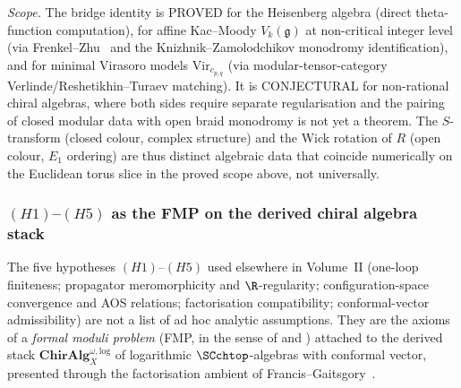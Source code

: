 \begin{remark}
\begin{enumerate}[label=(\alph*)]
\end{enumerate}
\emph{Scope.} The bridge identity is PROVED for the Heisenberg
algebra (direct theta-function computation), for affine Kac--Moody
$V_k(\mathfrak g)$ at non-critical integer level (via
Frenkel--Zhu~\cite{FrenkelZhu92} and the Knizhnik--Zamolodchikov
monodromy identification), and for minimal Virasoro models
$\mathrm{Vir}_{c_{p,q}}$ (via modular-tensor-category
Verlinde/Reshetikhin--Turaev matching). It is CONJECTURAL for
non-rational chiral algebras, where both sides require separate
regularisation and the pairing of closed modular data with open
braid monodromy is not yet a theorem.
The $S$-transform (closed colour, complex structure) and the Wick
rotation of $R$ (open colour, $E_1$ ordering) are thus distinct
algebraic data that coincide numerically on the Euclidean torus
slice in the proved scope above, not universally.
\end{remark}

\subsubsection{$(H1)$--$(H5)$ as the FMP on the derived chiral algebra stack}
\label{subsec:h-axioms-from-fmp}

The five hypotheses $(H1)$--$(H5)$ used elsewhere in Volume~II
(one-loop finiteness; propagator meromorphicity and $\R$-regularity;
configuration-space convergence and AOS relations; factorisation
compatibility; conformal-vector admissibility) are not a list of
ad hoc analytic assumptions. They are the axioms of a \emph{formal
moduli problem} (FMP, in the sense of \cite[Thm.~2.2.4]{Pridham}
and \cite[Ch.~15, Thm.~1.3.12]{HA}) attached to the derived stack
$\mathbf{ChirAlg}^{\omega,\mathrm{log}}_X$ of logarithmic
$\SCchtop$-algebras with conformal vector, presented through the
factorisation ambient of Francis--Gaitsgory~\cite{FG12}.

